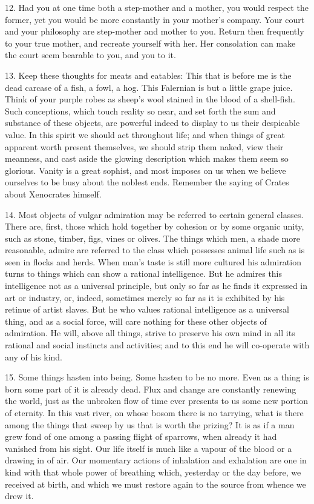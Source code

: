 \documentclass{book}
\begin{document}
12. Had you at one time both a step-mother and a mother, you would
respect the former, yet you would be more constantly in your mother's
company. Your court and your philosophy are step-mother and mother to
you. Return then frequently to your true mother, and recreate yourself
with her. Her consolation can make the court seem bearable to you, and
you to it.

13. Keep these thoughts for meats and eatables: This that is before me
is the dead carcase of a fish, a fowl, a hog. This Falernian is but a
little grape juice. Think of your purple robes as sheep's wool stained
in the blood of a shell-fish. Such conceptions, which touch reality so
near, and set forth the sum and substance of these objects, are
powerful indeed to display to us their despicable value. In this
spirit we should act throughout life; and when things of great
apparent worth present themselves, we should strip them naked, view
their meanness, and cast aside the glowing description which makes
them seem so glorious. Vanity is a great sophist, and most imposes on
us when we believe ourselves to be busy about the noblest
ends. Remember the saying of Crates about Xenocrates himself.

14. Most objects of vulgar admiration may be referred to certain
general classes. There are, first, those which hold together by
cohesion or by some organic unity, such as stone, timber, figs, vines
or olives. The things which men, a shade more reasonable, admire are
referred to the class which possesses animal life such as is seen in
flocks and herds. When man's taste is still more cultured his
admiration turns to things which can show a rational intelligence. But
he admires this intelligence not as a universal principle, but only so
far as he finds it expressed in art or industry, or, indeed, sometimes
merely so far as it is exhibited by his retinue of artist slaves. But
he who values rational intelligence as a universal thing, and as a
social force, will care nothing for these other objects of
admiration. He will, above all things, strive to preserve his own mind
in all its rational and social instincts and activities; and to this
end he will co-operate with any of his kind.

\newpage

15. Some things hasten into being. Some hasten to be no more. Even as
a thing is born some part of it is already dead. Flux and change are
constantly renewing the world, just as the unbroken flow of time ever
presents to us some new portion of eternity. In this vast river, on
whose bosom there is no tarrying, what is there among the things that
sweep by us that is worth the prizing? It is as if a man grew fond of
one among a passing flight of sparrows, when already it had vanished
from his sight. Our life itself is much like a vapour of the blood or
a drawing in of air. Our momentary actions of inhalation and
exhalation are one in kind with that whole power of breathing which,
yesterday or the day before, we received at birth, and which we must
restore again to the source from whence we drew it.
\end{document}
